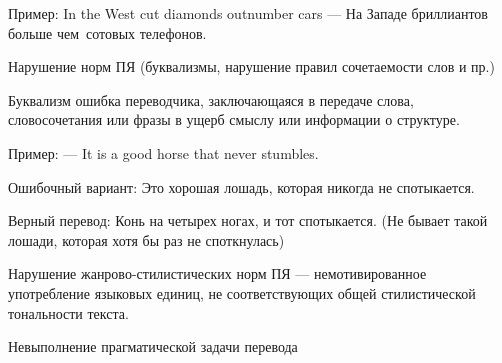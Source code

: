 Пример:  In the West cut diamonds outnumber cars --- На Западе бриллиантов больше чем сотовых телефонов.

Нарушение норм ПЯ (буквализмы, нарушение правил сочетаемости слов и пр.) 

Буквализм  ошибка переводчика, заключающаяся в передаче слова, словосочетания или фразы в ущерб смыслу или информации о структуре. 

Пример: --- It is a good horse that never stumbles. 

Ошибочный вариант: Это хорошая лошадь, которая никогда не спотыкается. 

Верный перевод:  Конь на четырех ногах, и тот спотыкается. (Не бывает такой лошади, которая хотя бы раз не споткнулась)

Нарушение жанрово-стилистических норм ПЯ --- немотивированное употребление  языковых  единиц,  не  соответствующих  общей  стилистической тональности текста. 

Невыполнение прагматической задачи перевода 



